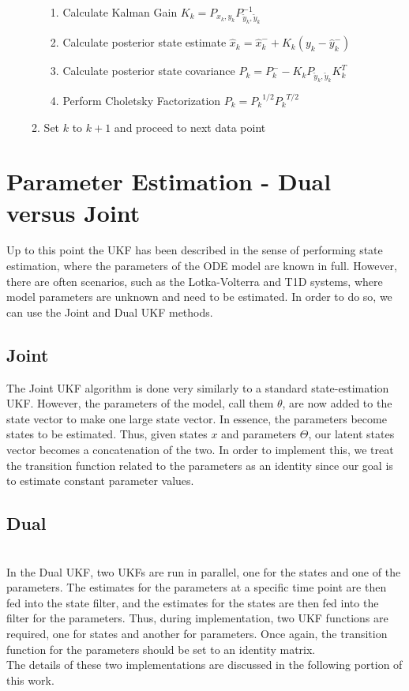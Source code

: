 \begin{tcolorbox}
\begin{enumerate}
\begin{enumerate}
\begin{enumerate}
            \item Calculate Kalman Gain $K_k = P_{x_k, y_k} P_{\tilde{y}_k, \tilde{y}_k}^{-1}$
            \item Calculate posterior state estimate $\hat{x}_k = \hat{x}_k^- + K_k(y_k - \hat{y}_k^-)$
            \item Calculate posterior state covariance $P_k = P_k^-  - K_k P_{\tilde{y}_k, \tilde{y}_k} K_k^T$
            \item Perform Choletsky Factorization $P_k = {P_k}^{1/2} {P_k}^{T/2}$
        \end{enumerate}
        \item Set $k$ to $k + 1$ and proceed to next data point
        
        \end{enumerate}
    \end{enumerate}


\end{tcolorbox}
\singlespacing    
    
    
    
\section{Parameter Estimation - Dual versus Joint}
Up to this point the UKF has been described in the sense of performing state estimation, where the parameters of the ODE model are known in full. However, there are often scenarios, such as the Lotka-Volterra and T1D systems, where model parameters are unknown and need to be estimated. In order to do so, we can use the Joint and Dual UKF methods.

    \subsection{Joint}
    The Joint UKF algorithm is done very similarly to a standard state-estimation UKF. However, the parameters of the model, call them $\theta$, are now added to the state vector to make one large state vector. In essence, the parameters become states to be estimated. Thus, given states $x$ and parameters $\Theta$, our latent states vector becomes a concatenation of the two. In order to implement this, we treat the transition function related to the parameters as an identity since our goal is to estimate constant parameter values.
    
    \subsection{Dual}\\
    In the Dual UKF, two UKFs are run in parallel, one for the states and one of the parameters. The estimates for the parameters at a specific time point are then fed into the state filter, and the estimates for the states are then fed into the filter for the parameters. Thus, during implementation, two UKF functions are required, one for states and another for parameters. Once again, the transition function for the parameters should be set to an identity matrix.\\
    
The details of these two implementations are discussed in the following portion of this work.